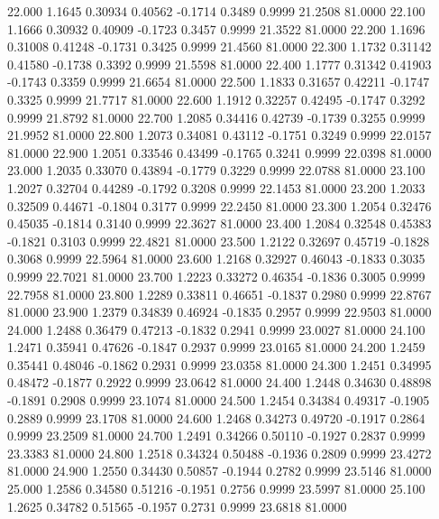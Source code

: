   22.000   1.1645   0.30934   0.40562  -0.1714   0.3489   0.9999  21.2508  81.0000
  22.100   1.1666   0.30932   0.40909  -0.1723   0.3457   0.9999  21.3522  81.0000
  22.200   1.1696   0.31008   0.41248  -0.1731   0.3425   0.9999  21.4560  81.0000
  22.300   1.1732   0.31142   0.41580  -0.1738   0.3392   0.9999  21.5598  81.0000
  22.400   1.1777   0.31342   0.41903  -0.1743   0.3359   0.9999  21.6654  81.0000
  22.500   1.1833   0.31657   0.42211  -0.1747   0.3325   0.9999  21.7717  81.0000
  22.600   1.1912   0.32257   0.42495  -0.1747   0.3292   0.9999  21.8792  81.0000
  22.700   1.2085   0.34416   0.42739  -0.1739   0.3255   0.9999  21.9952  81.0000
  22.800   1.2073   0.34081   0.43112  -0.1751   0.3249   0.9999  22.0157  81.0000
  22.900   1.2051   0.33546   0.43499  -0.1765   0.3241   0.9999  22.0398  81.0000
  23.000   1.2035   0.33070   0.43894  -0.1779   0.3229   0.9999  22.0788  81.0000
  23.100   1.2027   0.32704   0.44289  -0.1792   0.3208   0.9999  22.1453  81.0000
  23.200   1.2033   0.32509   0.44671  -0.1804   0.3177   0.9999  22.2450  81.0000
  23.300   1.2054   0.32476   0.45035  -0.1814   0.3140   0.9999  22.3627  81.0000
  23.400   1.2084   0.32548   0.45383  -0.1821   0.3103   0.9999  22.4821  81.0000
  23.500   1.2122   0.32697   0.45719  -0.1828   0.3068   0.9999  22.5964  81.0000
  23.600   1.2168   0.32927   0.46043  -0.1833   0.3035   0.9999  22.7021  81.0000
  23.700   1.2223   0.33272   0.46354  -0.1836   0.3005   0.9999  22.7958  81.0000
  23.800   1.2289   0.33811   0.46651  -0.1837   0.2980   0.9999  22.8767  81.0000
  23.900   1.2379   0.34839   0.46924  -0.1835   0.2957   0.9999  22.9503  81.0000
  24.000   1.2488   0.36479   0.47213  -0.1832   0.2941   0.9999  23.0027  81.0000
  24.100   1.2471   0.35941   0.47626  -0.1847   0.2937   0.9999  23.0165  81.0000
  24.200   1.2459   0.35441   0.48046  -0.1862   0.2931   0.9999  23.0358  81.0000
  24.300   1.2451   0.34995   0.48472  -0.1877   0.2922   0.9999  23.0642  81.0000
  24.400   1.2448   0.34630   0.48898  -0.1891   0.2908   0.9999  23.1074  81.0000
  24.500   1.2454   0.34384   0.49317  -0.1905   0.2889   0.9999  23.1708  81.0000
  24.600   1.2468   0.34273   0.49720  -0.1917   0.2864   0.9999  23.2509  81.0000
  24.700   1.2491   0.34266   0.50110  -0.1927   0.2837   0.9999  23.3383  81.0000
  24.800   1.2518   0.34324   0.50488  -0.1936   0.2809   0.9999  23.4272  81.0000
  24.900   1.2550   0.34430   0.50857  -0.1944   0.2782   0.9999  23.5146  81.0000
  25.000   1.2586   0.34580   0.51216  -0.1951   0.2756   0.9999  23.5997  81.0000
  25.100   1.2625   0.34782   0.51565  -0.1957   0.2731   0.9999  23.6818  81.0000
